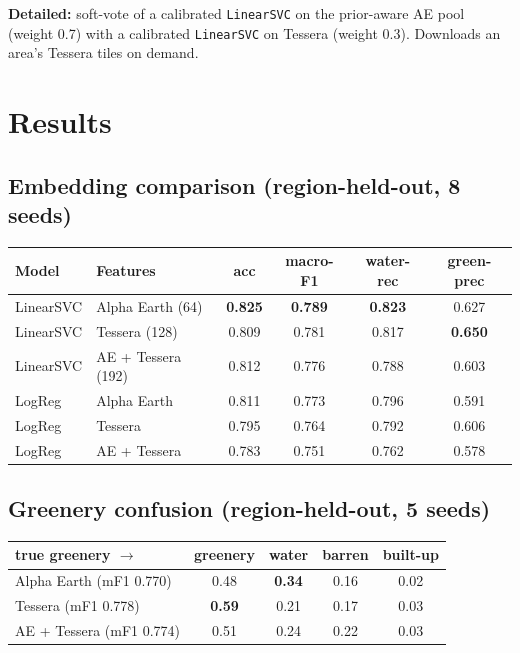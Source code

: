 \documentclass[11pt]{article}
\begin{document}
\smallskip
\noindent\textbf{Detailed:} soft-vote of a calibrated \texttt{LinearSVC} on the
prior-aware AE pool (weight 0.7) with a calibrated \texttt{LinearSVC} on Tessera
(weight 0.3). Downloads an area's Tessera tiles on demand.

\section{Results}

\subsection*{Embedding comparison (region-held-out, 8 seeds)}
\begin{table}[h]
\centering
\begin{tabular}{l l c c c c}
\toprule
\textbf{Model} & \textbf{Features} & \textbf{acc} & \textbf{macro-F1} & \textbf{water-rec} & \textbf{green-prec} \\
\midrule
LinearSVC & Alpha Earth (64) & \textbf{0.825} & \textbf{0.789} & \textbf{0.823} & 0.627 \\
LinearSVC & Tessera (128)    & 0.809 & 0.781 & 0.817 & \textbf{0.650} \\
LinearSVC & AE + Tessera (192) & 0.812 & 0.776 & 0.788 & 0.603 \\
LogReg    & Alpha Earth      & 0.811 & 0.773 & 0.796 & 0.591 \\
LogReg    & Tessera          & 0.795 & 0.764 & 0.792 & 0.606 \\
LogReg    & AE + Tessera     & 0.783 & 0.751 & 0.762 & 0.578 \\
\bottomrule
\end{tabular}
\end{table}

\subsection*{Greenery confusion (region-held-out, 5 seeds)}
\begin{table}[h]
\centering
\begin{tabular}{l c c c c}
\toprule
\textbf{true greenery $\rightarrow$} & greenery & water & barren & built-up \\
\midrule
Alpha Earth (mF1 0.770)  & 0.48 & \textbf{0.34} & 0.16 & 0.02 \\
Tessera (mF1 0.778)      & \textbf{0.59} & 0.21 & 0.17 & 0.03 \\
AE + Tessera (mF1 0.774) & 0.51 & 0.24 & 0.22 & 0.03 \\
\bottomrule
\end{tabular}
\end{table}
\end{document}
